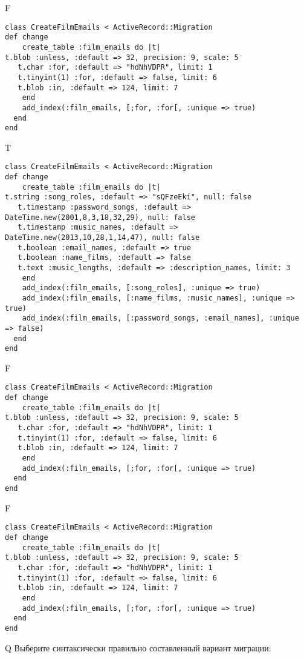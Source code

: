 F
\begin{verbatim}
class CreateFilmEmails < ActiveRecord::Migration
def change
	create_table :film_emails do |t|
t.blob :unless, :default => 32, precision: 9, scale: 5
   t.char :for, :default => "hdNhVDPR", limit: 1
   t.tinyint(1) :for, :default => false, limit: 6
   t.blob :in, :default => 124, limit: 7
   	end
	add_index(:film_emails, [;for, :for[, :unique => true)
  end 
end

\end{verbatim}

T
\begin{verbatim}
class CreateFilmEmails < ActiveRecord::Migration
def change
	create_table :film_emails do |t|
t.string :song_roles, :default => "sQFzeEki", null: false
   t.timestamp :password_songs, :default => DateTime.new(2001,8,3,18,32,29), null: false
   t.timestamp :music_names, :default => DateTime.new(2013,10,28,1,14,47), null: false
   t.boolean :email_names, :default => true
   t.boolean :name_films, :default => false
   t.text :music_lengths, :default => :description_names, limit: 3
   	end
	add_index(:film_emails, [:song_roles], :unique => true)
	add_index(:film_emails, [:name_films, :music_names], :unique => true)
	add_index(:film_emails, [:password_songs, :email_names], :unique => false)
  end 
end

\end{verbatim}

F
\begin{verbatim}
class CreateFilmEmails < ActiveRecord::Migration
def change
	create_table :film_emails do |t|
t.blob :unless, :default => 32, precision: 9, scale: 5
   t.char :for, :default => "hdNhVDPR", limit: 1
   t.tinyint(1) :for, :default => false, limit: 6
   t.blob :in, :default => 124, limit: 7
   	end
	add_index(:film_emails, [;for, :for[, :unique => true)
  end 
end

\end{verbatim}

F
\begin{verbatim}
class CreateFilmEmails < ActiveRecord::Migration
def change
	create_table :film_emails do |t|
t.blob :unless, :default => 32, precision: 9, scale: 5
   t.char :for, :default => "hdNhVDPR", limit: 1
   t.tinyint(1) :for, :default => false, limit: 6
   t.blob :in, :default => 124, limit: 7
   	end
	add_index(:film_emails, [;for, :for[, :unique => true)
  end 
end

\end{verbatim}

Q
Выберите синтаксически правильно составленный вариант миграции:

